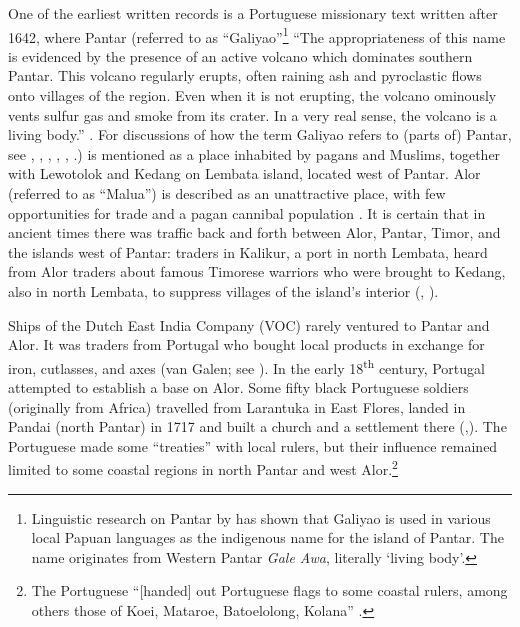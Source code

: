 One of the earliest written records is a Portuguese missionary text written after 1642, where Pantar (referred to as ``Galiyao''\footnote{Linguistic research on Pantar by \citet{Holton2010galiyao} has shown that Galiyao is used in various local Papuan languages as the indigenous name for the island of Pantar. The name originates from Western Pantar \textit{Gale Awa}, literally `living body'.} 
 { ``}{The appropriateness of this name is evidenced by the presence of an active volcano which dominates southern Pantar. This volcano regularly erupts, often raining ash and pyroclastic flows onto villages of the region. Even when it is not erupting, the volcano ominously vents sulfur gas and smoke from its crater. In a very real sense, the volcano is a living body.'' \citep{Holton2010}.} 
{For discussions of how the term Galiyao refers to (parts of) Pantar, see \citet[47]{LeRoux1929}, \citet[407]{Barnes1982majapahit}, \citet{Dietrich1984}, \citet{Rodemeier1995}, \citet[277]{Barnes2001}, \citet{Rodemeier2006}.}) is mentioned as a place inhabited by pagans and Muslims, together with Lewotolok and Kedang on Lembata island, located west of Pantar. Alor (referred to as ``Malua'') is described as an unattractive place, with few opportunities for trade and a pagan cannibal population \citep[101]{Hagerdal2012}. It is certain that in ancient times there was traffic back and forth between Alor, Pantar, Timor, and the islands west of Pantar: traders in Kalikur, a port in north Lembata, heard from Alor traders about famous Timorese warriors who were brought to Kedang, also in north Lembata, to suppress villages of the island's interior (\citealt[10.12]{Barnes1974}, \citealt[14]{LeRoux1929}). 

Ships of the Dutch East India Company (VOC) rarely ventured to Pantar and Alor. It was traders from Portugal who bought local products in exchange for iron, cutlasses, and axes (van Galen; see \citealt[17]{Hagerdal2010galens1}). In the early 18\textsuperscript{th} century, Portugal attempted to establish a base on Alor. Some fifty black Portuguese soldiers (originally from Africa) travelled from Larantuka in East Flores, landed in Pandai (north Pantar) in 1717 and built a church and a settlement there (\citealt[297]{Coolhaas1979},\citealt[78]{Rodemeier2006}). The Portuguese made some ``treaties'' with local rulers, but their influence remained limited to some coastal regions in north Pantar and west Alor.\footnote{The Portuguese ``[handed] out Portuguese flags to some coastal rulers, among others those of Koei, Mataroe, Batoelolong, Kolana'' \citep[2]{VanGaalen1945}.} 

